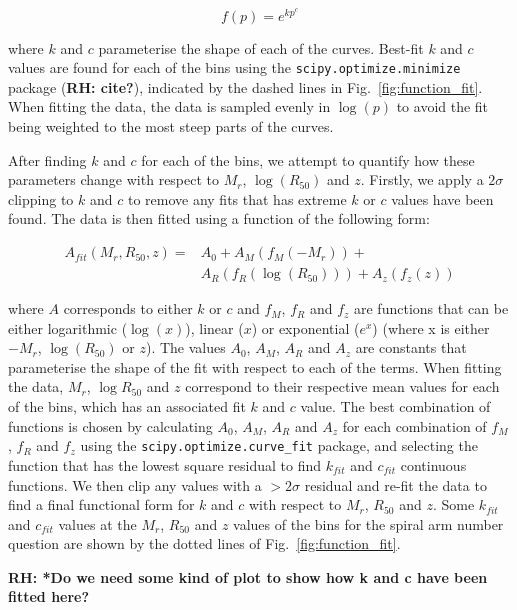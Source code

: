 \documentclass[useAMS,usenatbib]{mn2e}
\newcommand{\rh}[1]{{\bf \textcolor{RoyalPurple}{RH: #1}}}
\begin{document}
\begin{equation}
f(p) = e^{kp^{c}}
\end{equation}

where $k$ and $c$ parameterise the shape of each of the curves. Best-fit $k$ and $c$ values are found for each of the bins using the \texttt{scipy.optimize.minimize} package (\rh{cite?}), indicated by the dashed lines in Fig.~\ref{fig:function_fit}. When fitting the data, the data is sampled evenly in $\log(p)$ to avoid the fit being weighted to the most steep parts of the curves. 

After finding $k$ and $c$ for each of the bins, we attempt to quantify how these parameters change with respect to $M_r$, $\log(R_{50})$ and $z$. Firstly, we apply a $2\sigma$ clipping to $k$ and $c$ to remove any fits that has extreme $k$ or $c$ values have been found. The data is then fitted using a function of the following form:

\begin{equation}
\begin{split}
A_{fit}(M_r,R_{50},z) = & A_0 + A_M(f_M(-M_r)) +\\
						& A_R(f_R(\log({R_{50}}))) + A_z(f_z(z))
\end{split}
\end{equation}

where $A$ corresponds to either $k$ or $c$ and $f_M$, $f_R$ and $f_z$ are functions that can be either logarithmic ($\log(x)$), linear ($x$) or exponential ($e^x$) (where x is either $-M_r$, $\log(R_{50})$ or $z$). The values $A_0$, $A_M$, $A_R$ and $A_z$ are constants that parameterise the shape of the fit with respect to each of the terms. When fitting the data, $M_r$, $\log{R_{50}}$ and $z$ correspond to their respective mean values for each of the bins, which has an associated fit $k$ and $c$ value. The best combination of functions is chosen by calculating $A_0$, $A_M$, $A_R$ and $A_z$ for each combination of $f_M$, $f_R$ and $f_z$ using the \texttt{scipy.optimize.curve\_fit} package, and selecting the function that has the lowest square residual to find $k_{fit}$ and $c_{fit}$ continuous functions. We then clip any values with a $>2\sigma$ residual and re-fit the data to find a final functional form for $k$ and $c$ with respect to $M_r$, $R_{50}$ and $z$. Some $k_{fit}$ and $c_{fit}$ values at the $M_r$, $R_{50}$ and $z$ values of the bins for the spiral arm number question are shown by the dotted lines of Fig.~\ref{fig:function_fit}.

\rh{*Do we need some kind of plot to show how k and c have been fitted here?}
\end{document}
